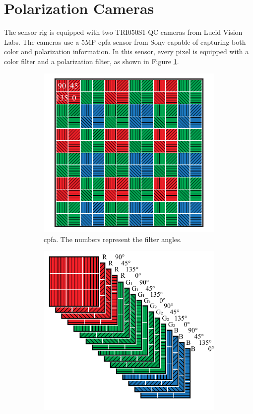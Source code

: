 \section{Polarization Cameras}
The sensor rig is equipped with two TRI050S1-QC cameras from Lucid Vision Labs.
The cameras use a 5MP \gls{cpfa} sensor from Sony capable of capturing both color and polarization information. 
In this sensor, every pixel is equipped with a color filter and a polarization filter, as shown in Figure \ref{fig:cpfa}.
\begin{figure}[H]
    \begin{subfigure}[B]{.48\textwidth}
        \centering
        \includegraphics[width=\textwidth]{figures/sensor_layout.pdf}
        \caption{\gls{cpfa}. The numbers represent the filter angles.\label{fig:cpfa}}
    \end{subfigure}
    \hfill
    \begin{subfigure}[B]{.48\textwidth}
        \includegraphics[width=\textwidth]{figures/sensor_packaging.pdf}

\end{subfigure}
\end{figure}
